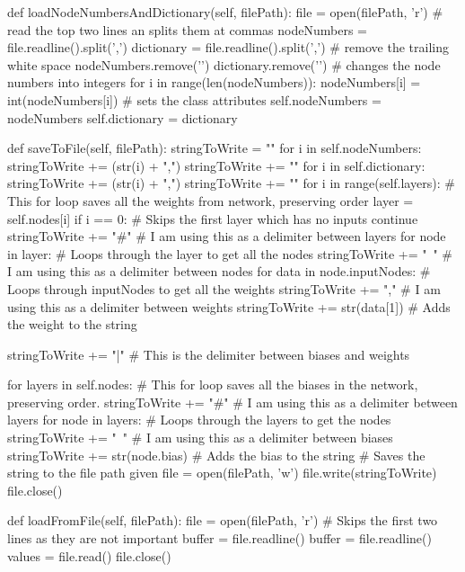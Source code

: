 \documentclass{report}
\begin{document}
\begin{python}
    def loadNodeNumbersAndDictionary(self, filePath):
        file = open(filePath, 'r')
        # read the top two lines an splits them at commas
        nodeNumbers = file.readline().split(',')
        dictionary = file.readline().split(',')
        # remove the trailing white space
        nodeNumbers.remove('\n')
        dictionary.remove('\n')
        # changes the node numbers into integers
        for i in range(len(nodeNumbers)):
            nodeNumbers[i] = int(nodeNumbers[i])
        # sets the class attributes
        self.nodeNumbers = nodeNumbers
        self.dictionary = dictionary

    def saveToFile(self, filePath):
        stringToWrite = ""
        for i in self.nodeNumbers:
            stringToWrite += (str(i) + ",")
        stringToWrite += "\n"
        for i in self.dictionary:
            stringToWrite += (str(i) + ",")
        stringToWrite += "\n"
        for i in range(self.layers):  # This for loop saves all the weights from network, preserving order
            layer = self.nodes[i]
            if i == 0:  # Skips the first layer which has no inputs
                continue
            stringToWrite += "#"  # I am using this as a delimiter between layers
            for node in layer:  # Loops through the layer to get all the nodes
                stringToWrite += "~"  # I am using this as a delimiter between nodes
                for data in node.inputNodes:  # Loops through inputNodes to get all the weights
                    stringToWrite += ","  # I am using this as a delimiter between weights
                    stringToWrite += str(data[1])  # Adds the weight to the string

        stringToWrite += "|"  # This is the delimiter between biases and weights

        for layers in self.nodes:  # This for loop saves all the biases in the network, preserving order.
            stringToWrite += "#"  # I am using this as a delimiter between layers
            for node in layers:  # Loops through the layers to get the nodes
                stringToWrite += "~"  # I am using this as a delimiter between biases
                stringToWrite += str(node.bias)  # Adds the bias to the string
        # Saves the string to the file path given
        file = open(filePath, 'w')
        file.write(stringToWrite)
        file.close()

    def loadFromFile(self, filePath):
        file = open(filePath, 'r')
        # Skips the first two lines as they are not important
        buffer = file.readline()
        buffer = file.readline()
        values = file.read()
        file.close()


\end{python}
\end{document}
